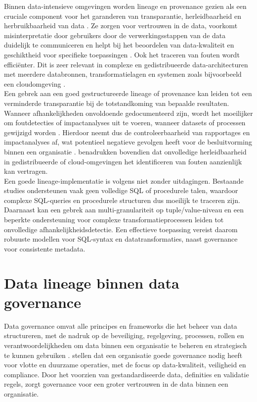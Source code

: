 Binnen data-intensieve omgevingen worden lineage en provenance gezien als een cruciale component voor het garanderen van transparantie, herleidbaarheid en herbruikbaarheid van data \autocite{mayernik2013data}. Ze zorgen voor vertrouwen in de data, voorkomt misinterpretatie door gebruikers door de verwerkingsstappen van de data duidelijk te communiceren en helpt bij het beoordelen van data-kwaliteit en geschiktheid voor specifieke toepassingen \autocite{mayernik2013data}. Ook het traceren van fouten wordt efficiënter. Dit is zeer relevant in complexe en gedistribueerde data-architecturen met meerdere databronnen, transformatielagen en systemen zoals bijvoorbeeld een cloudomgeving \autocite{patel2020data}.\\


Een gebrek aan een goed gestructureerde lineage of provenance kan leiden tot een verminderde transparantie bij de totstandkoming van bepaalde resultaten. Wanneer afhankelijkheden onvoldoende gedocumenteerd zijn, wordt het moeilijker om foutdetecties of impactanalyses uit te voeren, wanneer datasets of processen gewijzigd worden \autocite{patel2020data}. Hierdoor neemt dus de controleerbaarheid van rapportages en impactanalyses af, wat potentieel negatieve gevolgen heeft voor de besluitvorming binnen een organisatie \autocite{verma2024tracing}. \textcite{patel2020data} benadrukken bovendien dat onvolledige herleidbaarheid in gedistribueerde of cloud-omgevingen het identificeren van fouten aanzienlijk kan vertragen.\\


Een goede lineage-implementatie is volgens \textcite{tang2022modeling} niet zonder uitdagingen. Bestaande studies ondersteunen vaak geen volledige SQL of procedurele talen, waardoor complexe SQL-queries en procedurele structuren dus moeilijk te traceren zijn. Daarnaast kan een gebrek aan multi-granulariteit op tuple/value-niveau en een beperkte ondersteuning voor complexe transformatieprocessen leiden tot onvolledige afhankelijkheidsdetectie. Een effectieve toepassing vereist daarom robuuste modellen voor SQL-syntax en datatransformaties, naast governance voor consistente metadata.\\

\section{Data lineage binnen data governance}
\label{sec:lineage-governance}

Data governance omvat alle principes en frameworks die het beheer van data structureren, met de nadruk op de beveiliging, regelgeving, processen, rollen en verantwoordelijkheden om data binnen een organisatie te beheren en strategisch te kunnen gebruiken \autocite{verma2024tracing}. \textcite{verma2024tracing} stellen dat een organisatie goede governance nodig heeft voor vlotte en duurzame operaties, met de focus op data-kwaliteit, veiligheid en compliance. Door het voorzien van gestandardiseerde data, definities en validatie regels, zorgt governance voor een groter vertrouwen in de data binnen een organisatie.\\


